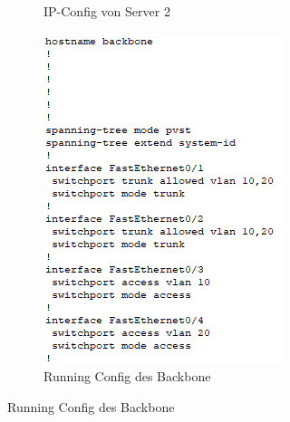 \begin{figure}[!htb]
\begin{subfigure}{.7\textwidth}
        \caption{IP-Config von Server 2}
    \end{subfigure}
    \begin{subfigure}{.5\textwidth}
        \includegraphics[width=\textwidth,height=1.15\textwidth,keepaspectratio]{./img/aufbau/BB.png}
        \caption{Running Config des Backbone}
    \end{subfigure}
\end{figure}
